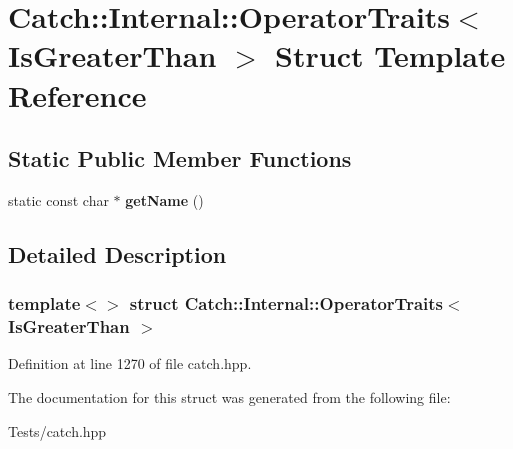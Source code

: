 \hypertarget{struct_catch_1_1_internal_1_1_operator_traits_3_01_is_greater_than_01_4}{}\section{Catch\+:\+:Internal\+:\+:Operator\+Traits$<$ Is\+Greater\+Than $>$ Struct Template Reference}
\label{struct_catch_1_1_internal_1_1_operator_traits_3_01_is_greater_than_01_4}
\subsection*{Static Public Member Functions}
\begin{DoxyCompactItemize}
\item 
\mbox{\label{struct_catch_1_1_internal_1_1_operator_traits_3_01_is_greater_than_01_4_ab917bfb9ccbe461dc684ee5a34d67d27}} 
static const char $\ast$ {\bfseries get\+Name} ()
\end{DoxyCompactItemize}


\subsection{Detailed Description}
\subsubsection*{template$<$$>$\newline
struct Catch\+::\+Internal\+::\+Operator\+Traits$<$ Is\+Greater\+Than $>$}



Definition at line 1270 of file catch.\+hpp.



The documentation for this struct was generated from the following file\+:\begin{DoxyCompactItemize}
\item 
Tests/catch.\+hpp\end{DoxyCompactItemize}
